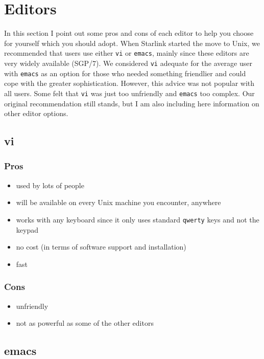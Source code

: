 \section{Editors}

In this section I point out some pros and cons of each editor to help you
choose for yourself which you should adopt. When Starlink started the move to
Unix, we recommended that users use either \verb|vi| or \verb|emacs|, mainly
since these editors are very widely available (SGP/7).
We considered \verb|vi| adequate
for the average user with \verb|emacs| as an option for those who needed 
something friendlier and could cope with the greater
sophistication. However, this advice was not popular with all users. Some felt
that \verb|vi| was just too unfriendly 
and \verb|emacs| too complex. Our original recommendation still
stands, but I am also including here information on other editor options.

\subsection{vi}

\subsubsection*{Pros}

\begin{itemize}
\item used by lots of people
\item will be available on every Unix machine you encounter, anywhere
\item works with any keyboard since it only uses standard {\tt qwerty} keys
and not the keypad
\item no cost (in terms of software support and installation)
\item fast
\end{itemize}

\subsubsection*{Cons}

\begin{itemize}
\item unfriendly
\item not as powerful as some of the other editors
\end{itemize}


\subsection{emacs}

